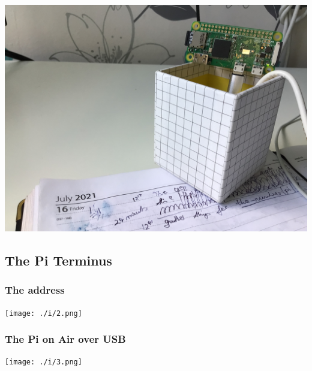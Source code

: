 \documentclass[11pt]{article}
\begin{document}
\includegraphics[width=.9\linewidth]{./i/1.jpg}
\subsection{The Pi Terminus}
\label{sec-1-6}
\subsubsection{The address}
\label{sec-1-6-1}

\texttt{[image: ./i/2.png]}
\subsubsection{The Pi on Air over USB}
\label{sec-1-6-2}

\texttt{[image: ./i/3.png]}
\end{document}
